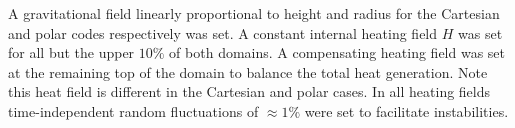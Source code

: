 \documentclass{article}
\begin{document}
\noindent A gravitational field linearly proportional to height and radius for the 
Cartesian and polar codes respectively was set. A constant internal 
heating field $H$ was set for all but the upper $10 \%$ of both domains. A 
compensating heating field was set at the remaining top of the domain to 
balance the total heat generation. Note this heat field is different in 
the Cartesian and polar cases. In all heating fields time-independent 
random fluctuations of $\approx 1 \%$ were set to facilitate instabilities.
\end{document}
